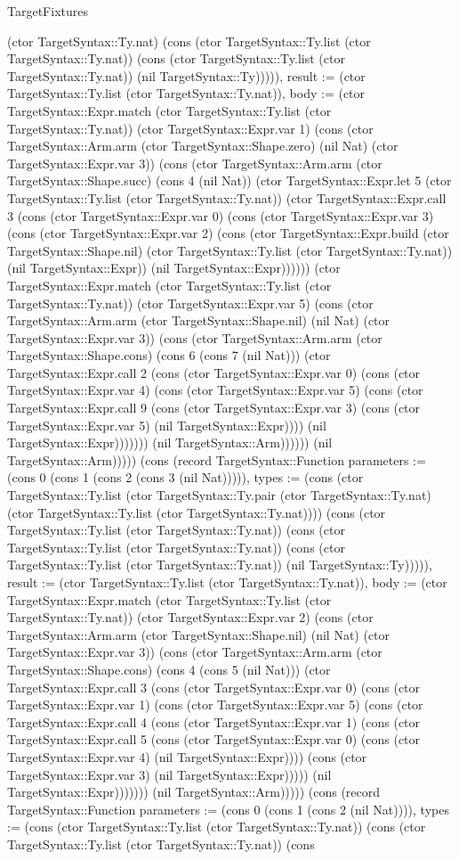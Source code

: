\begin{lexlean}{TargetFixtures}
\begin{semanticmodule}
{(ctor TargetSyntax::Ty.nat) (cons (ctor TargetSyntax::Ty.list (ctor TargetSyntax::Ty.nat)) (cons (ctor TargetSyntax::Ty.list (ctor TargetSyntax::Ty.nat)) (nil TargetSyntax::Ty))))), result := (ctor TargetSyntax::Ty.list (ctor TargetSyntax::Ty.nat)), body := (ctor TargetSyntax::Expr.match (ctor TargetSyntax::Ty.list (ctor TargetSyntax::Ty.nat)) (ctor TargetSyntax::Expr.var 1) (cons (ctor TargetSyntax::Arm.arm (ctor TargetSyntax::Shape.zero) (nil Nat) (ctor TargetSyntax::Expr.var 3)) (cons (ctor TargetSyntax::Arm.arm (ctor TargetSyntax::Shape.succ) (cons 4 (nil Nat)) (ctor TargetSyntax::Expr.let 5 (ctor TargetSyntax::Ty.list (ctor TargetSyntax::Ty.nat)) (ctor TargetSyntax::Expr.call 3 (cons (ctor TargetSyntax::Expr.var 0) (cons (ctor TargetSyntax::Expr.var 3) (cons (ctor TargetSyntax::Expr.var 2) (cons (ctor TargetSyntax::Expr.build (ctor TargetSyntax::Shape.nil) (ctor TargetSyntax::Ty.list (ctor TargetSyntax::Ty.nat)) (nil TargetSyntax::Expr)) (nil TargetSyntax::Expr)))))) (ctor TargetSyntax::Expr.match (ctor TargetSyntax::Ty.list (ctor TargetSyntax::Ty.nat)) (ctor TargetSyntax::Expr.var 5) (cons (ctor TargetSyntax::Arm.arm (ctor TargetSyntax::Shape.nil) (nil Nat) (ctor TargetSyntax::Expr.var 3)) (cons (ctor TargetSyntax::Arm.arm (ctor TargetSyntax::Shape.cons) (cons 6 (cons 7 (nil Nat))) (ctor TargetSyntax::Expr.call 2 (cons (ctor TargetSyntax::Expr.var 0) (cons (ctor TargetSyntax::Expr.var 4) (cons (ctor TargetSyntax::Expr.var 5) (cons (ctor TargetSyntax::Expr.call 9 (cons (ctor TargetSyntax::Expr.var 3) (cons (ctor TargetSyntax::Expr.var 5) (nil TargetSyntax::Expr)))) (nil TargetSyntax::Expr))))))) (nil TargetSyntax::Arm)))))) (nil TargetSyntax::Arm))))}) (cons (record TargetSyntax::Function {parameters := (cons 0 (cons 1 (cons 2 (cons 3 (nil Nat))))), types := (cons (ctor TargetSyntax::Ty.list (ctor TargetSyntax::Ty.pair (ctor TargetSyntax::Ty.nat) (ctor TargetSyntax::Ty.list (ctor TargetSyntax::Ty.nat)))) (cons (ctor TargetSyntax::Ty.list (ctor TargetSyntax::Ty.nat)) (cons (ctor TargetSyntax::Ty.list (ctor TargetSyntax::Ty.nat)) (cons (ctor TargetSyntax::Ty.list (ctor TargetSyntax::Ty.nat)) (nil TargetSyntax::Ty))))), result := (ctor TargetSyntax::Ty.list (ctor TargetSyntax::Ty.nat)), body := (ctor TargetSyntax::Expr.match (ctor TargetSyntax::Ty.list (ctor TargetSyntax::Ty.nat)) (ctor TargetSyntax::Expr.var 2) (cons (ctor TargetSyntax::Arm.arm (ctor TargetSyntax::Shape.nil) (nil Nat) (ctor TargetSyntax::Expr.var 3)) (cons (ctor TargetSyntax::Arm.arm (ctor TargetSyntax::Shape.cons) (cons 4 (cons 5 (nil Nat))) (ctor TargetSyntax::Expr.call 3 (cons (ctor TargetSyntax::Expr.var 0) (cons (ctor TargetSyntax::Expr.var 1) (cons (ctor TargetSyntax::Expr.var 5) (cons (ctor TargetSyntax::Expr.call 4 (cons (ctor TargetSyntax::Expr.var 1) (cons (ctor TargetSyntax::Expr.call 5 (cons (ctor TargetSyntax::Expr.var 0) (cons (ctor TargetSyntax::Expr.var 4) (nil TargetSyntax::Expr)))) (cons (ctor TargetSyntax::Expr.var 3) (nil TargetSyntax::Expr))))) (nil TargetSyntax::Expr))))))) (nil TargetSyntax::Arm))))}) (cons (record TargetSyntax::Function {parameters := (cons 0 (cons 1 (cons 2 (nil Nat)))), types := (cons (ctor TargetSyntax::Ty.list (ctor TargetSyntax::Ty.nat)) (cons (ctor TargetSyntax::Ty.list (ctor TargetSyntax::Ty.nat)) (cons }
\end{semanticmodule}
\end{lexlean}
